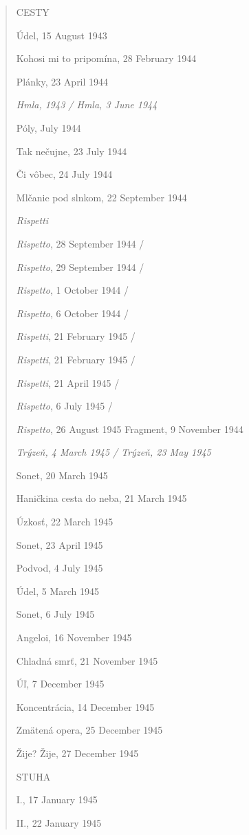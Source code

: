 \begin{paper}
\begin{quote}
CESTY

Údel, 15 August 1943

Kohosi mi to pripomína, 28 February 1944

Plánky, 23 April 1944

\emph{Hmla, 1943 / Hmla, 3 June 1944}

Póly, July 1944

Tak nečujne, 23 July 1944

Či vôbec, 24 July 1944

Mlčanie pod slnkom, 22 September 1944

\emph{Rispetti}

\setlength\parindent{14pt} \emph{Rispetto}, 28 September 1944 /

\emph{Rispetto}, 29 September 1944 /

\emph{Rispetto}, 1 October 1944 /

\emph{Rispetto}, 6 October 1944 /

\emph{Rispetti}, 21 February 1945 /

\emph{Rispetti}, 21 February 1945 /

\emph{Rispetti}, 21 April 1945 /

\emph{Rispetto}, 6 July 1945 /

\emph{Rispetto}, 26 August 1945
\setlength\parindent{0pt}
Fragment, 9 November 1944

\emph{Trýzeň, 4 March 1945 / Trýzeň, 23 May 1945}

Sonet, 20 March 1945

Haničkina cesta do neba, 21 March 1945

Úzkosť, 22 March 1945

Sonet, 23 April 1945

Podvod, 4 July 1945

Údel, 5 March 1945

Sonet, 6 July 1945

Angeloi, 16 November 1945

Chladná smrť, 21 November 1945

Úľ, 7 December 1945

Koncentrácia, 14 December 1945

Zmätená opera, 25 December 1945

Žije? Žije, 27 December 1945

\hfill

STUHA

I., 17 January 1945

II., 22 January 1945


\end{quote}
\end{paper}
